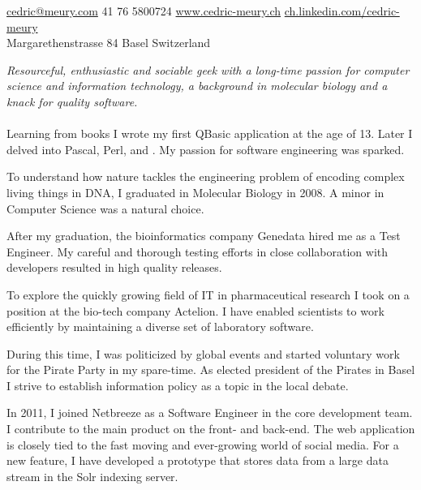 \documentclass[10pt,a4paper]{article}
\begin{document}
\sloppy  %


\nobreakvspace{0.3em}  %

\noindent\href{mailto:cedric@meury.com}{cedric@meury.com}\sbull
\textsmaller{+}41 76 5800724\sbull
\href{http://www.cedric-meury.ch/}{www.cedric-meury.ch}\sbull
\href{http://ch.linkedin.com/pub/cedric-meury/29/65/b96/}{ch.linkedin.com/cedric-meury}
\\
Margarethenstrasse 84 Basel\sbull
Switzerland

\spacedhrule{0.9em}{-0.4em}  %


\vspace{-1.3em}  %
\begin{multicols}{2}  %
\noindent \emph{Resourceful, enthusiastic and sociable geek with a long-time passion for computer science and information technology, a background in molecular biology and a knack for quality software.}
\\
\\
Learning from books I wrote my first QBasic application at the age of 13. Later I delved into Pascal, Perl,  and . My passion for software engineering was sparked.

To understand how nature tackles the engineering problem of encoding complex living things in DNA, I graduated in Molecular Biology in 2008. A minor in Computer Science was a natural choice.

After my graduation, the bioinformatics company Genedata hired me as a Test Engineer. My careful and thorough testing efforts in close collaboration with developers resulted in high quality releases.

To explore the quickly growing field of IT in pharmaceutical research I took on a position at the bio-tech company Actelion. I have enabled scientists to work efficiently by maintaining a diverse set of laboratory software. 

During this time, I was politicized by global events and started voluntary work for the Pirate Party in my spare-time. As elected president of the Pirates in Basel I strive to establish information policy as a topic in the local debate.

In 2011, I joined Netbreeze as a Software Engineer in the core development team. I contribute to the main product on the front- and back-end. The web application is closely tied to the fast moving and ever-growing world of social media. For a new feature, I have developed a prototype that stores data from a large data stream in the Solr indexing server.
\end{multicols}
\end{document}
